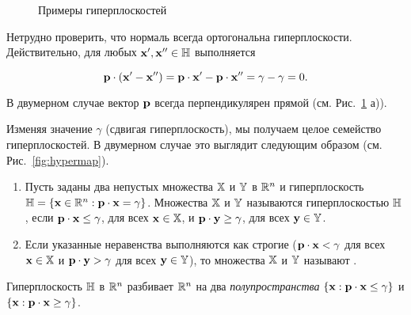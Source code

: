 \begin{figure}
\centering
\renewcommand{\thesubfigure}{\asbuk{subfigure})}
\hfill
{}
\caption{Примеры гиперплоскостей}\label{fig:Hplanes_exam}
\end{figure}

\begin{note}
Нетрудно проверить, что нормаль всегда ортогональна гиперплоскости.
Действительно, для любых $\mathbf{x}', \mathbf{x}'' \in \mathbb{H}$ выполняется

\[\mathbf{p} \cdot (\mathbf{x}' - \mathbf{x}'')= \mathbf{p} \cdot \mathbf{x}' - \mathbf{p}
\cdot \mathbf{x}''=\gamma - \gamma =0.\]

\noindent В двумерном случае вектор $\mathbf{p}$ всегда перпендикулярен
прямой (см. Рис.~\ref{fig:Hplanes_exam} а)).
\end{note}

Изменяя значение $\gamma$ (сдвигая гиперплоскость), мы получаем
целое семейство гиперплоскостей. В двумерном случае это выглядит
следующим образом (см. Рис.~\ref{fig:hypermap}).




\begin{dfn}

\begin{enumerate}
\renewcommand{\theenumi}{(\asbuk{enumi})}

\item Пусть заданы два непустых множества $\mathbb{X}$ и $\mathbb{Y}$ в $\mathbb{R}^n$ и
гиперплоскость $\mathbb{H}= \{ \mathbf{x}\in \mathbb{R}^n: \mathbf{p} \cdot \mathbf{x} =
\gamma\}$. Множества $\mathbb{X}$ и $\mathbb{Y}$ называются
 гиперплоскостью $\mathbb{H}$,
если $\mathbf{p} \cdot \mathbf{x} \leq \gamma$, для всех $\mathbf{x} \in
\mathbb{X}$, и $\mathbf{p} \cdot \mathbf{y} \geq \gamma$, для всех $\mathbf{y} \in
\mathbb{Y}$.

\item Если указанные неравенства выполняются как строгие ($\mathbf{p} \cdot \mathbf{x} < \gamma$
 для всех $\mathbf{x} \in \mathbb{X}$ и $\mathbf{p} \cdot \mathbf{y} > \gamma$ для всех $\mathbf{y} \in
 \mathbb{Y}$), то множества $\mathbb{X}$ и $\mathbb{Y}$ называют .
\end{enumerate}
\end{dfn}

Гиперплоскость $\mathbb{H}$ в $\mathbb{R}^n$ разбивает $\mathbb{R}^n$ на два
\emph{полупространства} ${\{ \mathbf{x}: \mathbf{p} \cdot \mathbf{x} \leq
\gamma\}}$ и ${\{ \mathbf{x}: \mathbf{p} \cdot \mathbf{x} \geq \gamma\}}$.


